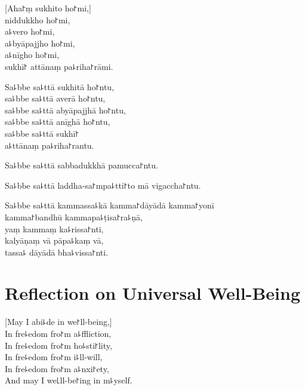 
\begin{leader}
\end{leader}

[Aha꜓ṃ sukhito ho꜓mi,]\\
niddukkho ho꜓mi,\\
a꜕vero ho꜓mi,\\
a꜕byāpajjho ho꜓mi,\\
a꜕nīgho ho꜓mi,\\
sukhī꜓ attānaṃ pa꜕riha꜓rāmi.

Sa꜕bbe sa꜕ttā sukhitā ho꜓ntu,\\
sa꜕bbe sa꜕ttā averā ho꜓ntu,\\
sa꜕bbe sa꜕ttā abyāpajjhā ho꜓ntu,\\
sa꜕bbe sa꜕ttā anīghā ho꜓ntu,\\
sa꜕bbe sa꜕ttā sukhī꜓\\
a꜕ttānaṃ pa꜕riha꜓rantu.

Sa꜕bbe sa꜕ttā sabbadukkhā pamucca꜓ntu.

Sa꜕bbe sa꜕ttā laddha-sa꜓mpa꜕tti꜓to mā vigaccha꜓ntu.

Sa꜕bbe sa꜕ttā kammassa꜕kā kamma꜓dāyādā kamma꜓yonī\\
\vin kamma꜓bandhū kammapa꜕ṭisa꜓ra꜕ṇā,\\
yaṃ kammaṃ ka꜕rissa꜓nti,\\
kalyāṇaṃ vā pāpa꜕kaṃ vā,\\
tassa꜕ dāyādā bha꜕vissa꜓nti.

\chapter[Universal Well-Being]{Reflection on Universal Well-Being}%


\begin{leader}
\end{leader}

[May I abi꜕de in we꜓ll-being,]\\
In fre꜕edom fro꜓m a꜕ffliction,\\
In fre꜕edom fro꜓m ho꜕sti꜓lity,\\
In fre꜕edom fro꜓m i꜕ll-will,\\
In fre꜕edom fro꜓m a꜕nxi꜓ety,\\
And may I  we꜖ll-be꜓ing in m꜕yself.

